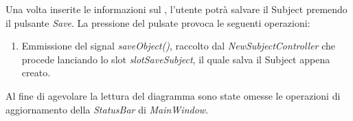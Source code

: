 Una volta inserite le informazioni sul \Subject, l'utente potrà salvare il Subject\g{} premendo il pulsante \textit{Save}. La pressione del pulsate provoca le seguenti operazioni:
\begin{enumerate}
	\item Emmissione del signal\g{} \textit{saveObject()}, raccolto dal \textit{NewSubjectController} che procede lanciando lo slot \textit{slotSaveSubject}, il quale salva il Subject\g{} appena creato.
\end{enumerate}

Al fine di agevolare la lettura del diagramma sono state omesse le operazioni di aggiornamento della \textit{StatusBar} di \textit{MainWindow}.
